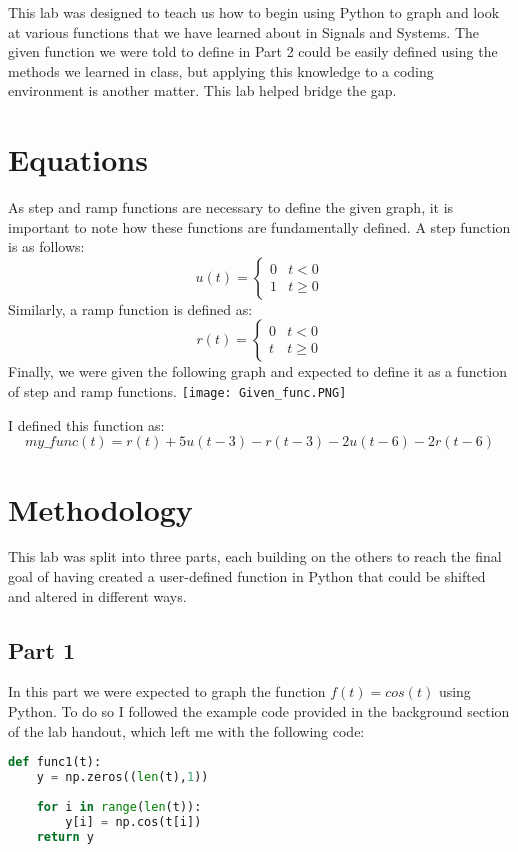 \documentclass[12pt]{report}
\begin{document}
This lab  was designed to teach us how to begin using Python to graph and look at various functions that we have learned about in Signals and Systems. The given function we were told to define in Part 2 could be easily defined using the methods we learned in class, but applying this knowledge to a coding environment is another matter. This lab helped bridge the gap.

\section{Equations}

As step and ramp functions are necessary to define the given graph, it is important to note how these functions are fundamentally defined. A step function is as follows: 
$$
    u(t) = 
    \begin{cases}
        0 & t < 0 \\
        1 & t\geq 0
    \end{cases}
$$
Similarly, a ramp function is defined as:
$$
    r(t) = 
    \begin{cases}
        0 & t < 0 \\
        t & t\geq 0
    \end{cases}
$$
Finally, we were given the following graph and expected to define it as a function of step and ramp functions.
\newline
\texttt{[image: Given\_func.PNG]}

I defined this function as:
$$my\_func(t) = r(t) + 5u(t-3) - r(t-3) - 2u(t-6) - 2r(t-6)$$

 \section{Methodology}
 
 This lab was split into three parts, each building on the others to reach the final goal of having created a user-defined function in Python that could be shifted and altered in different ways.
 
 \subsection{Part 1}
 
 In this part we were expected to graph the function $f(t)=cos(t)$ using Python. To do so I followed the example code provided in the background section of the lab handout, which left me with the following code:
 \begin{lstlisting}[language=Python]
 def func1(t):
    y = np.zeros((len(t),1))
      
    for i in range(len(t)):
        y[i] = np.cos(t[i])
    return y
 \end{lstlisting}
 
\end{document}
